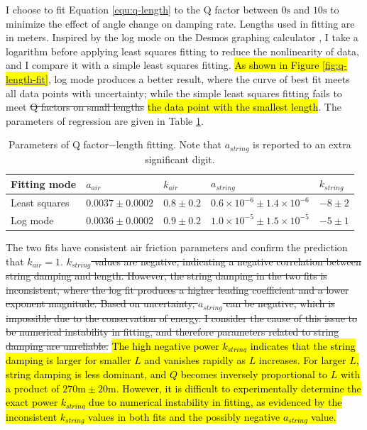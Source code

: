 \documentclass[12pt]{article}
\DeclareRobustCommand{\hlnew}[1]{{\sethlcolor{hlcnew}\hl{#1}}}
\DeclareRobustCommand{\hldel}[1]{{\st{#1}}}
\begin{document}
I choose to fit Equation {\ref{equ:q-length}} to the Q factor between $0\mathrm{s}$ and $10\mathrm{s}$ to minimize the effect of angle change on damping rate. Lengths used in fitting are in meters. Inspired by the log mode on the Desmos graphing calculator {\cite{desmos-log-mode}}, I take a logarithm before applying least squares fitting to reduce the nonlinearity of data, and I compare it with a simple least squares fitting. \hlnew{As shown in Figure {\ref{fig:q-length-fit}}}, log mode produces a better result, where the curve of best fit meets all data points with uncertainty; while the simple least squares fitting fails to meet \hldel{Q factors on small lengths} \hlnew{the data point with the smallest length}. The parameters of regression are given in Table {\ref{table:q-length-fit}}.

\begin{table}[h]
\begin{tabularx}{\textwidth}{ |X|l|l|l|l| }
\hline
Fitting mode &
$a_{air}$ & $k_{air}$ &
$a_{string}$ & $k_{string}$
\\ \hline
Least squares &
$0.0037\pm0.0002$ & $0.8\pm0.2$ &
$0.6\times10^{-6}\pm1.4\times10^{-6}$ & $-8\pm2$
\\ \hline
Log mode &
$0.0036\pm0.0002$ & $0.9\pm0.2$ &
$1.0\times10^{-5}\pm1.5\times10^{-5}$ & $-5\pm1$
\\ \hline
\end{tabularx}
\caption{Parameters of Q factor$-$length fitting. Note that $a_{string}$ is reported to an extra significant digit.}
\label{table:q-length-fit}
\end{table}

The two fits have consistent air friction parameters and confirm the prediction that $k_{air}=1$. \hldel{$k_{string}$ values are negative, indicating a negative correlation between string damping and length. However, the string damping in the two fits is inconsistent, where the log fit produces a higher leading coefficient and a lower exponent magnitude. Based on uncertainty, $a_{string}$ can be negative, which is impossible due to the conservation of energy. I consider the cause of this issue to be numerical instability in fitting, and therefore parameters related to string damping are unreliable.} \hlnew{The high negative power $k_{string}$ indicates that the string damping is larger for smaller $L$ and vanishes rapidly as $L$ increases. For larger $L$, string damping is less dominant, and $Q$ becomes inversely proportional to $L$ with a product of $270\mathrm{m}\pm20\mathrm{m}$. However, it is difficult to experimentally determine the exact power $k_{string}$ due to numerical instability in fitting, as evidenced by the inconsistent $k_{string}$ values in both fits and the possibly negative $a_{string}$ value.}
\end{document}

